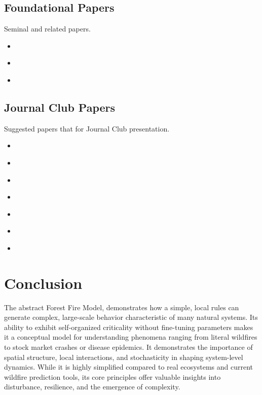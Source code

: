 \documentclass{article}
\begin{document}
\subsection{Foundational Papers}
Seminal and related papers.
\begin{itemize}
    \item \textcite{ForestFire_Bak1990}
    \item \textcite{ForestFire_Chen1990}
    \item \textcite{ForestFire_Drossel1992}
\end{itemize}

\subsection{Journal Club Papers}
Suggested papers that for Journal Club presentation.
\begin{itemize}
    \item \textcite{ForestFire_Rui2017}
    \item \textcite{ForestFire_Zhou2025}
    \item \textcite{ForestFire_Zheng2017}
    \item \textcite{ForestFire_Mutthulakshmi2020}
    \item \textcite{ForestFire_Freire2019}
    \item \textcite{ForestFire_Alexandridis2008}
    \item \textcite{ForestFire_Mutthulakshmi2020}
\end{itemize}

\section{Conclusion}
The abstract Forest Fire Model, demonstrates  how a simple, local rules can generate complex, large-scale behavior characteristic of many natural systems. Its ability to exhibit self-organized criticality without fine-tuning parameters makes it a conceptual model for understanding phenomena ranging from literal wildfires to stock market crashes or disease epidemics. It demonstrates the importance of spatial structure, local interactions, and stochasticity in shaping system-level dynamics. While it is highly simplified compared to real ecosystems and current wildfire prediction tools, its core principles offer valuable insights into disturbance, resilience, and the emergence of complexity. 

\printbibliography %
\end{document}
